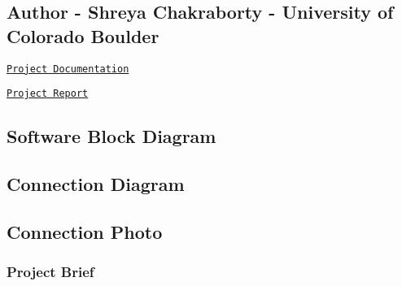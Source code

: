 \subsection*{Author -\/ Shreya Chakraborty -\/ University of Colorado Boulder}

\href{https://raw.githack.com/Shreya1809/ECEN5013_AESD-S19/master/Project1/doxygen/html/index.html}{\tt Project Documentation}

\href{report/PROJECT1_REPORT.pdf}{\tt Project Report}

\subsection*{Software Block Diagram}



\subsection*{Connection Diagram}



\subsection*{Connection Photo}



\subsubsection*{Project Brief}